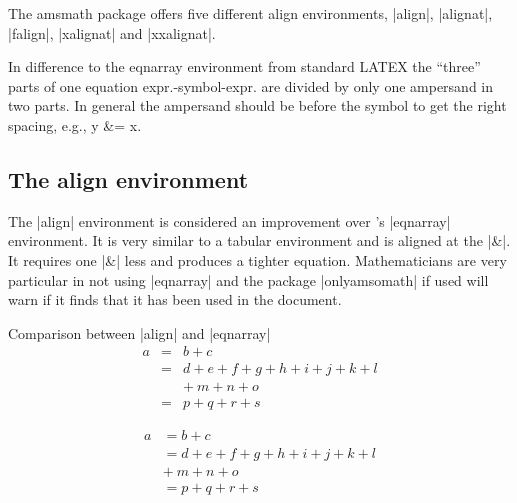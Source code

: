 The amsmath package offers five different align environments, |align|, |alignat|, |falign|, |xalignat| and |xxalignat|. 

In difference to the eqnarray environment from standard LATEX the ``three'' parts of one equation expr.-symbol-expr. are divided by only one ampersand in two parts. In general the ampersand should be before the symbol to get the right spacing, e.g., y \&= x. 

\subsection{The align environment}

The |align| environment is considered an improvement over \latex's |eqnarray| environment. It is very similar to a tabular
environment and is aligned at the |&|. It requires one |&| less and produces a tighter equation. Mathematicians are very particular in not
using |eqnarray| and the package |onlyamsomath| if used will warn if it finds that it has been used in the document.


\begin{texexample}{Comparison between |align| and |eqnarray|}{}
\begin{eqnarray}
a & = & b + c \\
  & = & d + e + f + g + h + i
        + j + k + l \nonumber \\
  &   & +\: m + n + o \\
  & = & p + q + r + s
\end{eqnarray}

\begin{align}
a & =  b + c \\
  & =  d + e + f + g + h + i
       + j + k + l \nonumber \\
  & +\: m + n + o \\
  & =  p + q + r + s
\end{align}
\end{texexample}

